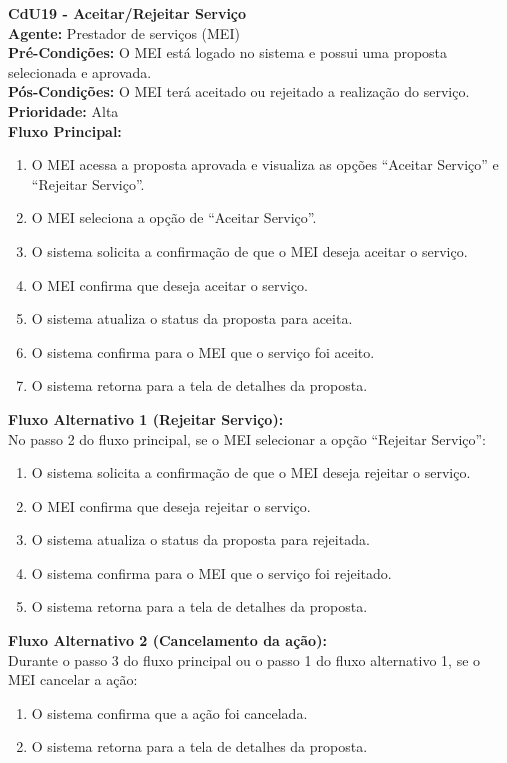 \vspace{7pt}
\noindent\textbf{\normalsize CdU19 - Aceitar/Rejeitar Serviço}\\
\noindent\textbf{Agente:} Prestador de serviços (MEI)\\ 
\textbf{Pré-Condições:} O MEI está logado no sistema e possui uma proposta selecionada e aprovada.\\ 
\textbf{Pós-Condições:} O MEI terá aceitado ou rejeitado a realização do serviço.\\
\textbf{Prioridade:} Alta \vspace{3pt}\\
\noindent\textbf{Fluxo Principal:}
\begin{enumerate}[noitemsep, topsep=-5pt, parsep=0pt]
    \item O MEI acessa a proposta aprovada e visualiza as opções ``Aceitar Serviço'' e ``Rejeitar Serviço''.
    \item O MEI seleciona a opção de ``Aceitar Serviço''.
    \item O sistema solicita a confirmação de que o MEI deseja aceitar o serviço.
    \item O MEI confirma que deseja aceitar o serviço.
    \item O sistema atualiza o status da proposta para aceita.
    \item O sistema confirma para o MEI que o serviço foi aceito.
    \item O sistema retorna para a tela de detalhes da proposta.
\end{enumerate}

\noindent\textbf{Fluxo Alternativo 1 (Rejeitar Serviço):}\\
No passo 2 do fluxo principal, se o MEI selecionar a opção ``Rejeitar Serviço'':
\begin{enumerate}[noitemsep, topsep=-5pt, parsep=0pt]
    \item O sistema solicita a confirmação de que o MEI deseja rejeitar o serviço.
    \item O MEI confirma que deseja rejeitar o serviço.
    \item O sistema atualiza o status da proposta para rejeitada.
    \item O sistema confirma para o MEI que o serviço foi rejeitado.
    \item O sistema retorna para a tela de detalhes da proposta.
\end{enumerate}

\noindent\textbf{Fluxo Alternativo 2 (Cancelamento da ação):}\\
Durante o passo 3 do fluxo principal ou o passo 1 do fluxo alternativo 1, se o MEI cancelar a ação:
\begin{enumerate}[noitemsep, topsep=-5pt, parsep=0pt]
    \item O sistema confirma que a ação foi cancelada.
    \item O sistema retorna para a tela de detalhes da proposta.
\end{enumerate}

